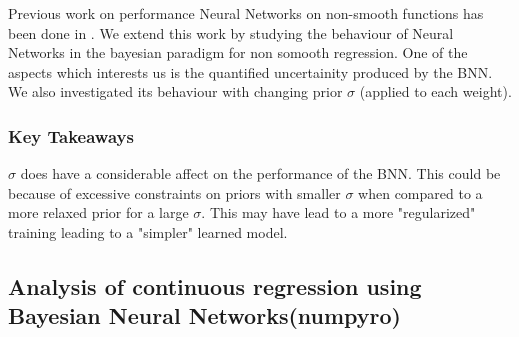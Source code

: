 \documentclass[a4paper,twocolumn]{article}
\begin{document}
Previous work on performance Neural Networks on non-smooth functions has been done in \cite{NNnonsmooth}. We extend this work by studying the behaviour of Neural Networks in the bayesian paradigm for non somooth regression. One of the aspects which interests us is the quantified uncertainity produced by the BNN. We also investigated its behaviour with changing prior $\sigma$ (applied to each weight). 



\subsubsection*{Key Takeaways}
\label{sec-5-4-1}
$\sigma$ does have a considerable affect on the performance of the BNN. This could be because of excessive constraints on priors with smaller $\sigma$ when compared to a more relaxed prior for a large $\sigma$. This may have lead to a more "regularized" training leading to a "simpler" learned model.


\subsection{Analysis of continuous regression using Bayesian Neural Networks(numpyro)}
\label{sec-5-5}
\end{document}
